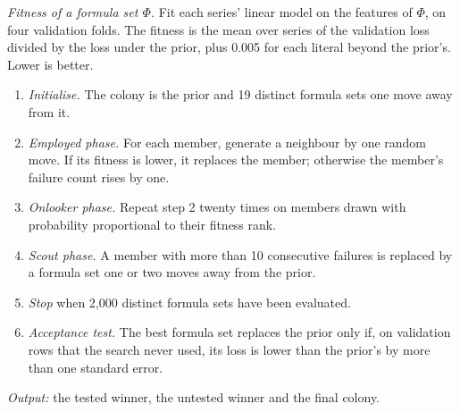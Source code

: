 \begin{algorithm}[H]
\caption{ABC refinement of group formulas (one asset class, task and re-selection date)}\label{alg:1}
\small
\emph{Fitness of a formula set \ensuremath{\Phi}.} Fit each series' linear model on the features of \ensuremath{\Phi}, on four validation folds. The fitness is the mean over series of the validation loss divided by the loss under the prior, plus 0.005 for each literal beyond the prior's. Lower is better.

\begin{enumerate}
\item \emph{Initialise.} The colony is the prior and 19 distinct formula sets one move away from it.
\item \emph{Employed phase.} For each member, generate a neighbour by one random move. If its fitness is lower, it replaces the member; otherwise the member's failure count rises by one.
\item \emph{Onlooker phase.} Repeat step 2 twenty times on members drawn with probability proportional to their fitness rank.
\item \emph{Scout phase.} A member with more than 10 consecutive failures is replaced by a formula set one or two moves away from the prior.
\item \emph{Stop} when 2,000 distinct formula sets have been evaluated.
\item \emph{Acceptance test.} The best formula set replaces the prior only if, on validation rows that the search never used, its loss is lower than the prior's by more than one standard error.
\end{enumerate}

\emph{Output:} the tested winner, the untested winner and the final colony.
\end{algorithm}
